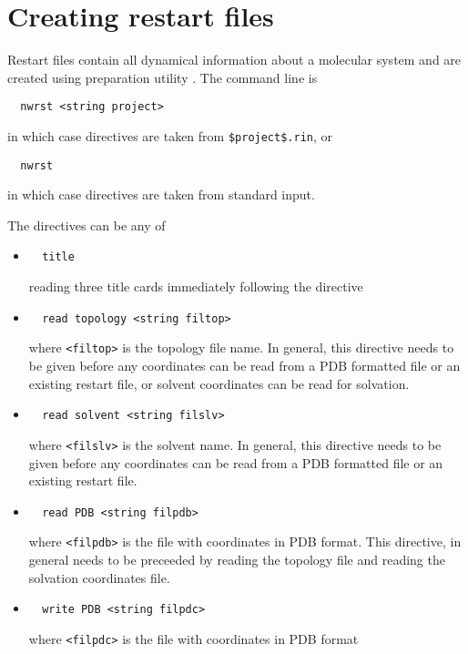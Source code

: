 \section{Creating restart files}
\label{sec:nwanwrst}
Restart files contain all dynamical information about a molecular
system and are created using preparation utility \nwrst. The command
line is
\begin{verbatim}
  nwrst <string project>
\end{verbatim}
in which case directives are taken from \verb+$project$.rin+, or
\begin{verbatim}
  nwrst
\end{verbatim}
in which case directives are taken from standard input.

The directives can be any of
\begin{itemize}

\item
\begin{verbatim}
  title
\end{verbatim}
reading three title cards immediately following the directive

\item
\begin{verbatim}
  read topology <string filtop>
\end{verbatim}
where \verb+<filtop>+ is the topology file name. In general, this
directive needs to be given before any coordinates can be read from a
PDB formatted file or an existing restart file, or solvent coordinates
can be read for solvation.

\item
\begin{verbatim}
  read solvent <string filslv>
\end{verbatim}
where \verb+<filslv>+ is the solvent name. In general, this directive
needs to be given before any coordinates can be read from a PDB
formatted file or an existing restart file.

\item
\begin{verbatim}
  read PDB <string filpdb>
\end{verbatim}
where \verb+<filpdb>+ is the file with coordinates in PDB format. This
directive, in general needs to be preceeded by reading the topology
file and reading the solvation coordinates file.

\item
\begin{verbatim}
  write PDB <string filpdc>
\end{verbatim}
where \verb+<filpdc>+ is the file with coordinates in PDB format


\end{itemize}
